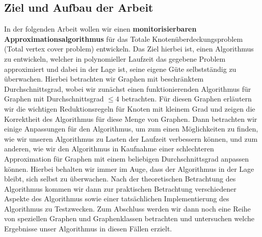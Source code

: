 \documentclass[12pt,onecolumn, notitlepage]{scrartcl}
\begin{document}
\subsection{Ziel und Aufbau der Arbeit}
In der folgenden Arbeit wollen wir einen \textbf{monitorisierbaren Approximationsalgorithmus} für das Totale Knotenüberdeckungsproblem (Total vertex cover problem) entwickeln. Das Ziel hierbei ist, einen Algorithmus zu entwickeln, welcher in polynomieller Laufzeit das gegebene Problem approximiert und dabei in der Lage ist, seine eigene Güte selbstständig zu überwachen. Hierbei betrachten wir Graphen mit beschränktem Durchschnittsgrad, wobei wir zunächst einen funktionierenden Algorithmus für Graphen mit Durchschnittsgrad $\leq 4$ betrachten. \newline
Für diesen Graphen erläutern wir die wichtigen Reduktionsregeln für Knoten mit kleinem Grad und zeigen die Korrektheit des Algorithmus für diese Menge von Graphen.  \newline
Dann betrachten wir einige Anpassungen für den Algorithmus, um zum einen Möglichkeiten zu finden, wie wir unseren Algorithmus zu Lasten der Laufzeit verbessern können, und zum anderen, wie wir den Algorithmus in Kaufnahme einer schlechteren Approximation für Graphen mit einem beliebigen Durchschnittsgrad anpassen können. Hierbei behalten wir immer im Auge, dass der Algorithmus in der Lage bleibt, sich selbst zu überwachen.  \newline
Nach der theoretischen Betrachtung des Algorithmus kommen wir dann zur praktischen Betrachtung verschiedener Aspekte des Algorithmus sowie einer tatsächlichen Implementierung des Algorithmus zu Testzwecken.  \newline
Zum Abschluss werden wir dann noch eine Reihe von speziellen Graphen und Graphenklassen betrachten und untersuchen welche Ergebnisse unser Algorithmus in diesen Fällen erzielt. \newline
\end{document}
